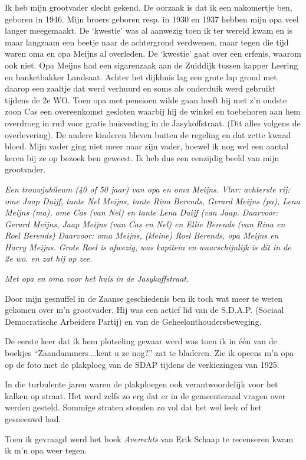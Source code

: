 \documentclass[10pt,twoside,openright]{memoir}
\begin{document}
Ik heb mijn grootvader slecht gekend. De oorzaak is dat ik een nakomertje ben, geboren in 1946. Mijn broers geboren resp. in 1930 en 1937 hebben mijn opa veel langer meegemaakt. 
De ‘kwestie’ was al aanwezig toen ik ter wereld kwam en is maar langzaam een beetje naar de achtergrond verdwenen, maar tegen die tijd waren oma en opa Meijns al overleden.
De ‘kwestie’ gaat over een erfenis, waarom ook niet. Opa Meijns had een sigarenzaak aan de Zuiddijk tussen kapper Leering en banketbakker Landsaat. Achter het dijkhuis lag een grote lap grond met daarop een zaaltje dat werd verhuurd en soms als onderduik werd gebruikt tijdens de 2e WO. 
Toen opa met pensioen wilde gaan heeft hij met z’n oudste zoon Cas een overeenkomst gesloten waarbij hij de winkel en toebehoren aan hem overdroeg in ruil voor gratis huisvesting in de Jasykoffstraat. (Dit alles volgens de overlevering). De andere kinderen bleven buiten de regeling en dat zette kwaad bloed. Mijn vader ging niet meer naar zijn vader, hoewel ik nog wel een aantal keren bij ze op bezoek ben geweest. Ik heb dus een eenzijdig beeld van mijn grootvader.

\emph{Een trouwjubileum (40 of 50 jaar) van opa en oma Meijns. Vlnr: achterste rij: ome Jaap Duijf, tante Nel Meijns, tante Rina Berends, Gerard Meijns (pa), Lena Meijns (ma), ome Cas (van Nel) en tante Lena Duijf (van Jaap.
Daarvoor: Gerard Meijns, Jaap Meijns (van Cas en Nel) en Ellie Berends (van Rina en Roel Berends)
Daarvoor: oma Meijns, (kleine) Roel Berends, opa Meijns en Harry Meijns. Grote Roel is afwezig, was kapitein en waarschijnlijk is dit in de 2e wo. en zat hij op zee.
}

\emph{Met opa en oma voor het huis in de Jasykoffstraat.
}

Door mijn gesnuffel in de Zaanse geschiedenis ben ik toch wat meer te weten gekomen over m’n grootvader. Hij was een actief lid van de S.D.A.P. (Sociaal Democratische Arbeiders Partij) en van de Geheelonthoudersbeweging.

De eerste keer dat ik hem plotseling gewaar werd was toen ik in één van de boekjes “Zaandammers….kent u ze nog?” zat te bladeren. Zie ik opeens m’n opa op de foto met de plakploeg van de SDAP tijdens de verkiezingen van 1925. 

In die turbulente jaren waren de plakploegen ook verantwoordelijk voor het kalken op straat. Het werd zelfs zo erg dat er in de gemeenteraad vragen over werden gesteld. Sommige straten stonden zo vol dat het wel leek of het gesneeuwd had.

Toen ik gevraagd werd het boek \emph{Averechts} van Erik Schaap te recenseren kwam ik m’n opa weer tegen. 
\end{document}
